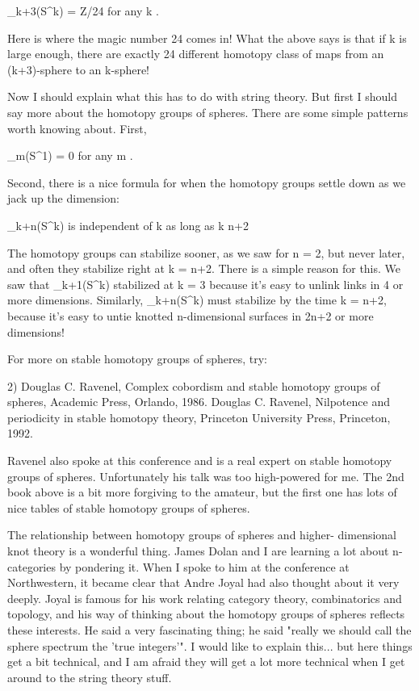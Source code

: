 \pi _{k+3}(S^{k}) = Z/24     for any k .

Here is where the magic number 24 comes in!  What the above says
is that if k is large enough, there are exactly 24 different homotopy
class of maps from an (k+3)-sphere to an k-sphere!  

Now I should explain what this has to do with string theory.  But first
I should say more about the homotopy groups of spheres.  There are some
simple patterns worth knowing about.  First,

\pi _{m}(S^{1}) = {0}         for any m .

Second, there is a nice formula for when the homotopy groups settle
down as we jack up the dimension:

\pi _{k+n}(S^{k})   is independent of k as long as k \ge  n+2

The homotopy groups can stabilize sooner, as we saw for n = 2, but never
later, and often they stabilize right at k = n+2.  There is a simple
reason for this.  We saw that \pi _{k+1}(S^{k}) stabilized at k = 3 because
it's easy to unlink links in 4 or more dimensions.  Similarly,
\pi _{k+n}(S^{k}) must stabilize by the time k = n+2, because it's easy to
untie knotted n-dimensional surfaces in 2n+2 or more dimensions!

For more on stable homotopy groups of spheres, try:

2) Douglas C. Ravenel, Complex cobordism and stable homotopy groups of
spheres, Academic Press, Orlando, 1986. 
Douglas C. Ravenel, Nilpotence and periodicity in stable homotopy
theory, Princeton University Press, Princeton, 1992.  

Ravenel also spoke at this conference and is a real expert on stable
homotopy groups of spheres.  Unfortunately his talk was too high-powered
for me.  The 2nd book above is a bit more forgiving to the amateur,
but the first one has lots of nice tables of stable homotopy groups
of spheres.   

The relationship between homotopy groups of spheres and higher-
dimensional knot theory is a wonderful thing.  James Dolan and I are
learning a lot about n-categories by pondering it.  When I spoke to
him at the conference at Northwestern, it became clear that Andre
Joyal had also thought about it very deeply.  Joyal is famous for his
work relating category theory, combinatorics and topology, and his way
of thinking about the homotopy groups of spheres reflects these
interests.  He said a very fascinating thing; he said "really we
should call the sphere spectrum the 'true integers'".  I
would like to explain this... but here things get a bit technical, and
I am afraid they will get a lot more technical when I get around to
the string theory stuff.

